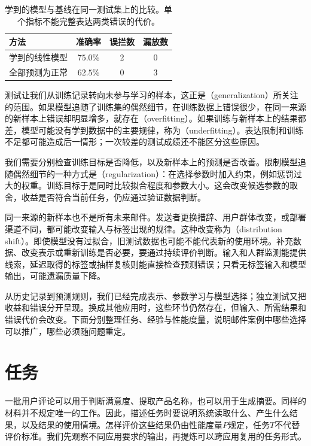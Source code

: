\begin{table}[htbp]
  \centering
  \small
  \begin{tabularx}{\linewidth}{@{}Xccc@{}}
    \toprule
    \textbf{方法} & \textbf{准确率} & \textbf{误拦数} & \textbf{漏放数} \\
    \midrule
    学到的线性模型 & $75.0\%$ & 2 & 0 \\
    全部预测为正常 & $62.5\%$ & 0 & 3 \\
    \bottomrule
  \end{tabularx}
  \caption{学到的模型与基线在同一测试集上的比较。单个指标不能完整表达两类错误的代价。}
  \label{tab:spam-baseline-comparison}
\end{table}

测试让我们从训练记录转向未参与学习的样本，这正是（generalization）所关注的范围。如果模型追随了训练集的偶然细节，在训练数据上错误很少，在同一来源的新样本上错误却明显增多，就存在（overfitting）。如果训练与新样本上的结果都差，模型可能没有学到数据中的主要规律，称为（underfitting）。表达限制和训练不足都可能造成后一情形；一次较差的测试成绩还不能区分这些原因。

我们需要分别检查训练目标是否降低，以及新样本上的预测是否改善。限制模型追随偶然细节的一种方式是（regularization）：在选择参数时加入约束，例如惩罚过大的权重。训练目标于是同时比较拟合程度和参数大小。这会改变候选参数的取舍，收益是否符合当前任务，仍应通过验证数据判断。

同一来源的新样本也不是所有未来邮件。发送者更换措辞、用户群体改变，或部署渠道不同，都可能改变输入与标签出现的规律。这种改变称为（distribution shift）。即使模型没有过拟合，旧测试数据也可能不能代表新的使用环境。补充数据、改变表示或重新训练是否必要，要通过持续评价判断。输入和人群监测能提供线索，延迟取得的标签或抽样复核则能直接检查预测错误；只看无标签输入和模型输出，可能遗漏质量下降。

从历史记录到预测规则，我们已经完成表示、参数学习与模型选择；独立测试又把收益和错误分开呈现。换成其他应用时，这些环节仍然存在，但输入、所需结果和错误代价会改变。下面分别整理任务、经验与性能度量，说明邮件案例中哪些选择可以推广，哪些必须随问题重定。

\section{任务}
\label{sec:machine-learning-tasks}

一批用户评论可以用于判断满意度、提取产品名称，也可以用于生成摘要。同样的材料并不规定唯一的工作。因此，描述任务时要说明系统读取什么、产生什么结果，以及结果的使用情境。怎样评价这些结果仍由性能度量$P$规定，任务$T$不代替评价标准。我们先观察不同应用要求的输出，再提炼可以跨应用复用的任务形式。

